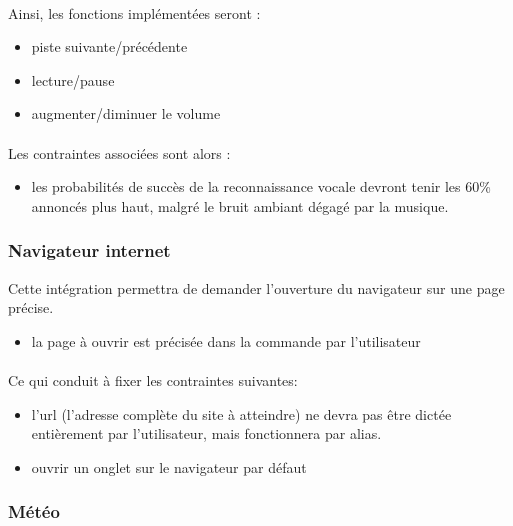 \documentclass[12pt]{article}
\begin{document}
    \paragraph{}
    Ainsi, les fonctions implémentées seront :
    \begin{itemize}
        \item piste suivante/précédente
        \item lecture/pause
        \item augmenter/diminuer le volume
    \end{itemize}

    \paragraph{}
    Les contraintes associées sont alors :
    \begin{itemize}
        \item les probabilités de succès de la reconnaissance vocale devront
            tenir les 60\% annoncés plus haut, malgré le bruit ambiant dégagé
            par la musique.
    \end{itemize}

    \subsubsection{Navigateur internet}
    Cette intégration permettra de demander l'ouverture du navigateur sur une
    page précise.

    \begin{itemize}
        \item la page à ouvrir est précisée dans la commande par l'utilisateur
    \end{itemize}

    \paragraph{}
    Ce qui conduit à fixer les contraintes suivantes:
    \begin{itemize}
        \item l'url (l'adresse complète du site à atteindre) ne devra pas être
            dictée entièrement par l'utilisateur, mais fonctionnera par alias.
        \item ouvrir un onglet sur le navigateur par défaut
    \end{itemize}

    \subsubsection{Météo}
\end{document}
